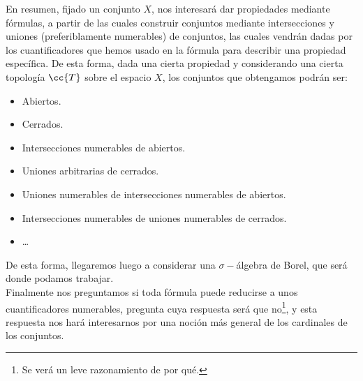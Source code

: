 En resumen, fijado un conjunto $X$, nos interesará dar propiedades mediante fórmulas, a partir de las cuales construir conjuntos mediante intersecciones y uniones (preferiblamente numerables) de conjuntos, las cuales vendrán dadas por los cuantificadores que hemos usado en la fórmula para describir una propiedad específica. De esta forma, dada una cierta propiedad y considerando una cierta topología $\cc{T}$ sobre el espacio $X$, los conjuntos que obtengamos podrán ser:
\begin{itemize}
    \item Abiertos.
    \item Cerrados.
    \item Intersecciones numerables de abiertos.
    \item Uniones arbitrarias de cerrados.
    \item Uniones numerables de intersecciones numerables de abiertos.
    \item Intersecciones numerables de uniones numerables de cerrados.
    \item \ldots
\end{itemize}
De esta forma, llegaremos luego a considerar una $\sigma-$álgebra de Borel, que será donde podamos trabajar.\\

Finalmente nos preguntamos si toda fórmula puede reducirse a unos cuantificadores numerables, pregunta cuya respuesta será que no\footnote{Se verá un leve razonamiento de por qué.}, y esta respuesta nos hará interesarnos por una noción más general de los cardinales de los conjuntos.
